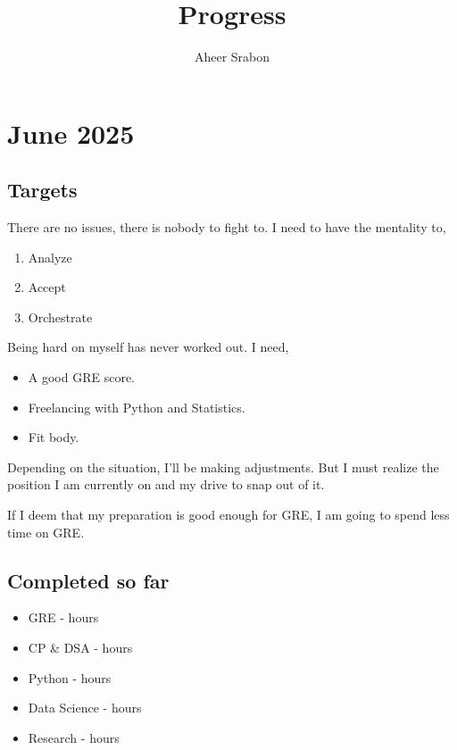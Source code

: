 \documentclass[11pt]{article}
\title{Progress}
\author{Aheer Srabon}
\date{}
\begin{document}
\maketitle

\section*{June 2025}



\subsection*{Targets}
\noindent There are no issues, there is nobody to fight to. I need to have the mentality to,

\begin{enumerate}
\itemsep0em
  \item Analyze
  \item Accept
  \item Orchestrate
\end{enumerate}

\noindent Being hard on myself has never worked out. I need,

\begin{itemize}
\itemsep0em
  \item A good GRE score.
  \item Freelancing with Python and Statistics.
  \item Fit body.
\end{itemize}

\noindent Depending on the situation, I'll be making adjustments. But I must realize the position I am currently
on and my drive to snap out of it.

\noindent If I deem that my preparation is good enough for GRE, I am going to spend less time on GRE.

\subsection*{Completed so far}
\begin{itemize}
\itemsep0em
  \item GRE           - \juneGRE hours
  \item CP \& DSA     - \juneDSACP hours
  \item Python        - \junePYTHON hours
  \item Data Science  - \juneDS hours
  \item Research      - \juneRESEARCH hours
\end{itemize}
\end{document}
